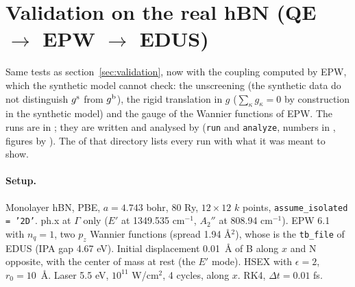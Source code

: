\documentclass[11pt]{article}
\begin{document}
\section{Validation on the real hBN (QE \texorpdfstring{$\to$}{->} EPW \texorpdfstring{$\to$}{->} EDUS)}\label{sec:validation_epw}
Same tests as section~\ref{sec:validation}, now with the coupling computed by EPW, which the synthetic model cannot
check: the unscreening (the synthetic data do not distinguish $g^{\rm s}$ from $g^{\rm b}$), the rigid translation in
$g$ ($\sum_\kappa g_\kappa = 0$ by construction in the synthetic model) and the gauge of the Wannier functions of EPW.
The runs are in ; they are written and analysed by 
(\texttt{run} and \texttt{analyze}, numbers in , figures by ). The
 of that directory lists every run with what it was meant to show.

\paragraph{Setup.} Monolayer hBN, PBE, $a=4.743$ bohr, 80 Ry, $12\times12$ $k$ points, \texttt{assume\_isolated = '2D'}.
ph.x at $\Gamma$ only ($E'$ at 1349.535 cm$^{-1}$, $A_2''$ at 808.94 cm$^{-1}$). EPW 6.1 with $n_q=1$, two $p_z$ Wannier
functions (spread 1.94 \AA$^2$), whose  is the \texttt{tb\_file} of EDUS (IPA gap 4.67 eV). Initial
displacement 0.01~\AA{} of B along $x$ and N opposite, with the center of mass at rest (the $E'$ mode). HSEX with
$\epsilon=2$, $r_0=10$~\AA. Laser 5.5 eV, $10^{11}$ W/cm$^2$, 4 cycles, along $x$. RK4, $\Delta t = 0.01$ fs.
\end{document}
